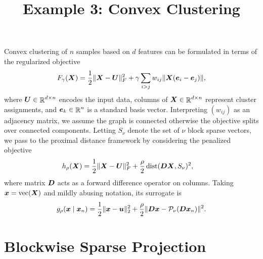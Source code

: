 \documentclass[11pt]{article}
\title{Example 3: Convex Clustering}
\author{}
\date{}
\begin{document}
\maketitle

Convex clustering of \(n\) samples based on \(d\) features can be formulated in terms of the regularized objective
\begin{equation}
    \label{eq:regularized-objective}
    F_{\gamma}(\boldsymbol{X})
    =
    \frac{1}{2} \|\boldsymbol{X} - \boldsymbol{U}\|_{F}^{2}
    +
    \gamma \sum_{i > j} w_{ij} \|\boldsymbol{X} (\boldsymbol{e}_{i} - \boldsymbol{e}_{j})\|,
\end{equation}
where \(\boldsymbol{U} \in \mathop{\mathbb{R}}\nolimits^{d \times n}\) encodes the input data, columns of \(\boldsymbol{X} \in \mathop{\mathbb{R}}\nolimits^{d \times n}\) represent cluster assignments, and \(\boldsymbol{e}_{k} \in \mathop{\mathbb{R}}\nolimits^{n}\) is a standard basis vector.
Interpreting $(w_{ij})$ as an adjacency matrix, we assume the graph is connected otherwise the objective splits over connected components.
Letting \(S_{\nu}\) denote the set of \(\nu\) block sparse vectors, we pass to the proximal distance framework by considering the penalized objective
\begin{align*}
    h_{\rho}(\boldsymbol{X})
    &=
    \frac{1}{2}\|\boldsymbol{X} - \boldsymbol{U}\|_{F}^{2}
    +
    \frac{\rho}{2} \mathop{\rm dist}\nolimits(\boldsymbol{D} \boldsymbol{X}, S_{\nu})^{2},
\end{align*}
where matrix $\boldsymbol{D}$ acts as a forward difference operator on columns.
Taking $\boldsymbol{x} = \mathop{\rm vec}\nolimits(\boldsymbol{X})$ and mildly abusing notation, its surrogate is
\begin{equation*}
    g_{\rho}(\boldsymbol{x} \mid \boldsymbol{x}_{n})
    =
    \frac{1}{2}\|\boldsymbol{x} - \boldsymbol{u}\|_{2}^{2}
    +
    \frac{\rho}{2} \|\boldsymbol{D} \boldsymbol{x} - \mathcal{P}_{\nu}(\boldsymbol{D} \boldsymbol{x}_{n})\|^{2}.
\end{equation*}

\section*{\center Blockwise Sparse Projection}
\end{document}
